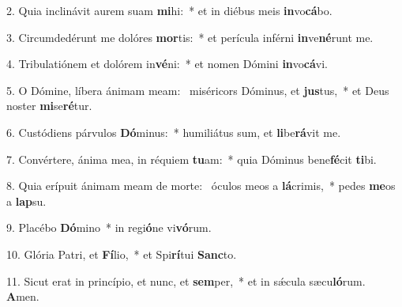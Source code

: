 2. Quia inclinávit aurem suam \textbf{mi}hi:~*  et in diébus meis \textbf{in}vo\textbf{cá}bo.\

3. Circumdedérunt me dolóres \textbf{mor}tis:~*  et perícula inférni \textbf{in}ve\textbf{né}runt me.\

4. Tribulatiónem et dolórem in\textbf{vé}ni:~*  et nomen Dómini \textbf{in}vo\textbf{cá}vi.\

5. O Dómine, líbera ánimam meam: \dag\  miséricors Dóminus, et \textbf{jus}tus,~*  et Deus noster \textbf{mi}se\textbf{ré}tur.\

6. Custódiens párvulos \textbf{Dó}minus:~*  humiliátus sum, et \textbf{li}be\textbf{rá}vit me.\

7. Convértere, ánima mea, in réquiem \textbf{tu}am:~*  quia Dóminus bene\textbf{fé}cit \textbf{ti}bi.\

8. Quia erípuit ánimam meam de morte: \dag\  óculos meos a \textbf{lá}crimis,~*  pedes \textbf{me}os a \textbf{lap}su.\

9. Placébo \textbf{Dó}mino~*  in regi\textbf{ó}ne vi\textbf{vó}rum.\

10. Glória Patri, et \textbf{Fí}lio,~*  et Spi\textbf{rí}tui \textbf{Sanc}to.\

11. Sicut erat in princípio, et nunc, et \textbf{sem}per,~*  et in sǽcula sæcu\textbf{ló}rum. \textbf{A}men.\

